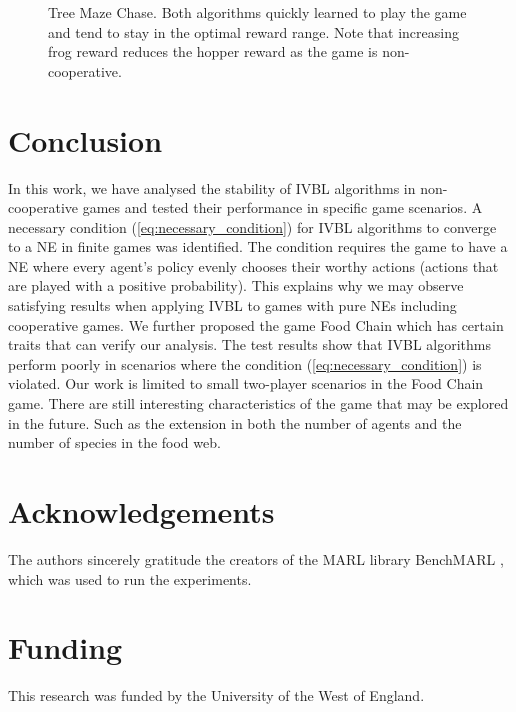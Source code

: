 \documentclass[]{interact}
\theoremstyle{plain}%
\theoremstyle{definition}
\theoremstyle{remark}
\begin{document}
\begin{figure}
\centering
{}
\caption{Tree Maze Chase. Both algorithms quickly learned to play the game and tend to stay in the optimal reward range. Note that increasing frog reward reduces the hopper reward as the game is non-cooperative.}
\label{fig:tree_maze_chase_rewards}
\end{figure}

\section{Conclusion}
In this work, we have analysed the stability of IVBL algorithms in non-cooperative games and tested their performance in specific game scenarios. A necessary condition (\ref{eq:necessary_condition}) for IVBL algorithms to converge to a NE in finite games was identified. The condition requires the game to have a NE where every agent's policy evenly chooses their worthy actions (actions that are played with a positive probability). This explains why we may observe satisfying results when applying IVBL to games with pure NEs including cooperative games. We further proposed the game Food Chain which has certain traits that can verify our analysis. The test results show that IVBL algorithms perform poorly in scenarios where the condition (\ref{eq:necessary_condition}) is violated. Our work is limited to small two-player scenarios in the Food Chain game. There are still interesting characteristics of the game that may be explored in the future. Such as the extension in both the number of agents and the number of species in the food web.

\section*{Acknowledgements}
The authors sincerely gratitude the creators of the MARL library BenchMARL \cite{bettini2024benchmarl}, which was used to run the experiments.

\section*{Funding}
This research was funded by the University of the West of England.
\end{document}
